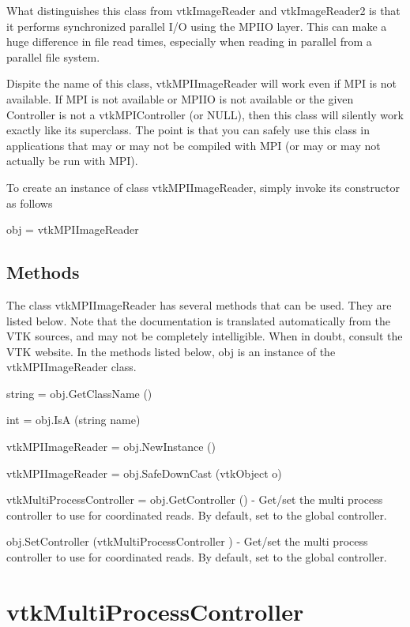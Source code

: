 What distinguishes this class from vtk\-Image\-Reader and vtk\-Image\-Reader2 is that it performs synchronized parallel I/\-O using the M\-P\-I\-I\-O layer. This can make a huge difference in file read times, especially when reading in parallel from a parallel file system.

Dispite the name of this class, vtk\-M\-P\-I\-Image\-Reader will work even if M\-P\-I is not available. If M\-P\-I is not available or M\-P\-I\-I\-O is not available or the given Controller is not a vtk\-M\-P\-I\-Controller (or N\-U\-L\-L), then this class will silently work exactly like its superclass. The point is that you can safely use this class in applications that may or may not be compiled with M\-P\-I (or may or may not actually be run with M\-P\-I).

To create an instance of class vtk\-M\-P\-I\-Image\-Reader, simply invoke its constructor as follows \begin{DoxyVerb}  obj = vtkMPIImageReader
\end{DoxyVerb}
 \hypertarget{vtkwidgets_vtkxyplotwidget_Methods}{}\subsection{Methods}\label{vtkwidgets_vtkxyplotwidget_Methods}
The class vtk\-M\-P\-I\-Image\-Reader has several methods that can be used. They are listed below. Note that the documentation is translated automatically from the V\-T\-K sources, and may not be completely intelligible. When in doubt, consult the V\-T\-K website. In the methods listed below, {\ttfamily obj} is an instance of the vtk\-M\-P\-I\-Image\-Reader class. 
\begin{DoxyItemize}
\item {\ttfamily string = obj.\-Get\-Class\-Name ()}  
\item {\ttfamily int = obj.\-Is\-A (string name)}  
\item {\ttfamily vtk\-M\-P\-I\-Image\-Reader = obj.\-New\-Instance ()}  
\item {\ttfamily vtk\-M\-P\-I\-Image\-Reader = obj.\-Safe\-Down\-Cast (vtk\-Object o)}  
\item {\ttfamily vtk\-Multi\-Process\-Controller = obj.\-Get\-Controller ()} -\/ Get/set the multi process controller to use for coordinated reads. By default, set to the global controller.  
\item {\ttfamily obj.\-Set\-Controller (vtk\-Multi\-Process\-Controller )} -\/ Get/set the multi process controller to use for coordinated reads. By default, set to the global controller.  
\end{DoxyItemize}\hypertarget{vtkparallel_vtkmultiprocesscontroller}{}\section{vtk\-Multi\-Process\-Controller}\label{vtkparallel_vtkmultiprocesscontroller}
